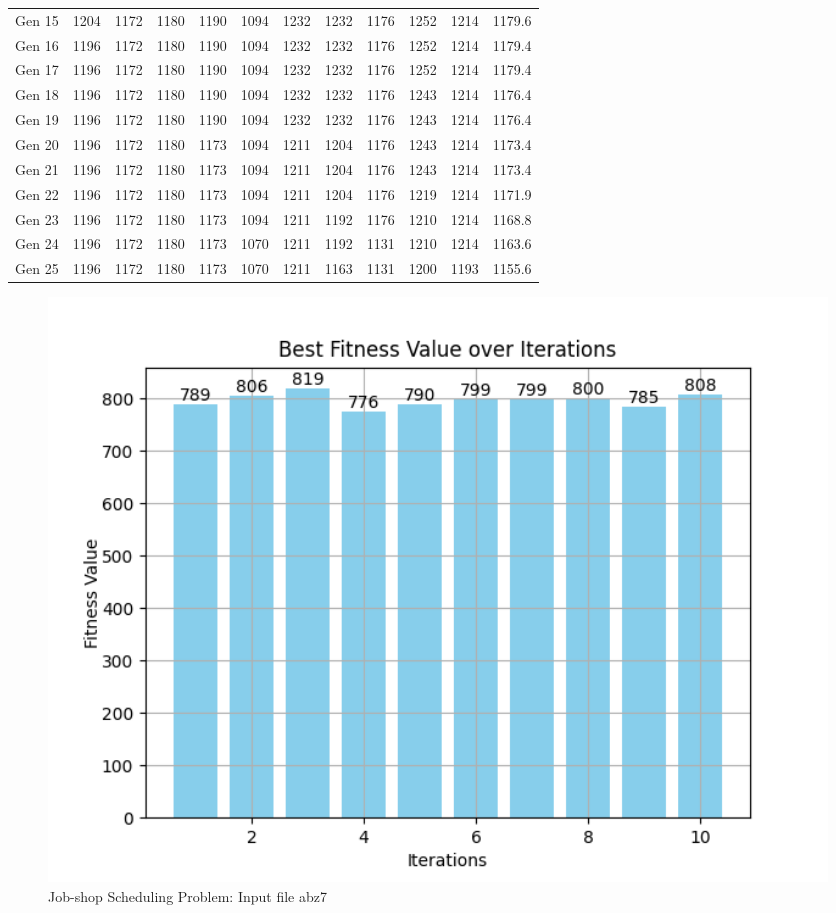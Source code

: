 \documentclass[12pt]{article}
\begin{document}
\begin{table}[h]
\begin{adjustbox}{max width=1\textwidth}
\begin{tabular}{*{12}{c}}
            Gen 15 & 1204 & 1172 & 1180 & 1190 & 1094 & 1232 & 1232 & 1176 & 1252 & 1214 & 1179.6 \\
            Gen 16 & 1196 & 1172 & 1180 & 1190 & 1094 & 1232 & 1232 & 1176 & 1252 & 1214 & 1179.4 \\
            Gen 17 & 1196 & 1172 & 1180 & 1190 & 1094 & 1232 & 1232 & 1176 & 1252 & 1214 & 1179.4 \\
            Gen 18 & 1196 & 1172 & 1180 & 1190 & 1094 & 1232 & 1232 & 1176 & 1243 & 1214 & 1176.4 \\
            Gen 19 & 1196 & 1172 & 1180 & 1190 & 1094 & 1232 & 1232 & 1176 & 1243 & 1214 & 1176.4 \\
            Gen 20 & 1196 & 1172 & 1180 & 1173 & 1094 & 1211 & 1204 & 1176 & 1243 & 1214 & 1173.4 \\
            Gen 21 & 1196 & 1172 & 1180 & 1173 & 1094 & 1211 & 1204 & 1176 & 1243 & 1214 & 1173.4 \\
            Gen 22 & 1196 & 1172 & 1180 & 1173 & 1094 & 1211 & 1204 & 1176 & 1219 & 1214 & 1171.9 \\
            Gen 23 & 1196 & 1172 & 1180 & 1173 & 1094 & 1211 & 1192 & 1176 & 1210 & 1214 & 1168.8 \\
            Gen 24 & 1196 & 1172 & 1180 & 1173 & 1070 & 1211 & 1192 & 1131 & 1210 & 1214 & 1163.6 \\
            Gen 25 & 1196 & 1172 & 1180 & 1173 & 1070 & 1211 & 1163 & 1131 & 1200 & 1193 & 1155.6 \\
            \bottomrule
        \end{tabular}
    \end{adjustbox}
\end{table}

\newpage

\begin{figure}[h]
    \centering
    \includegraphics[width=1\textwidth]{images/abz7_rntr1000-200-500-0.45-10.png}
    \caption{Job-shop Scheduling Problem: Input file abz7}
\end{figure}
\end{document}
